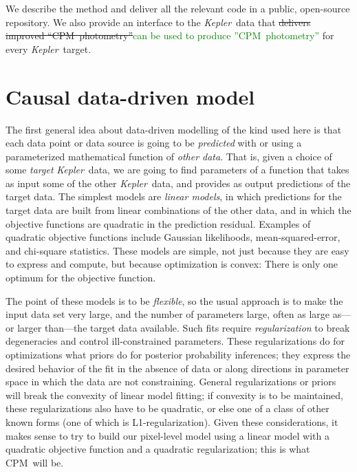 \documentclass[12pt, preprint]{aastex}
\newcommand{\project}[1]{\textsl{#1}}
\newcommand{\Kepler}{\project{Kepler}}
\newcommand{\name}{CPM}
\newcommand{\revise}[1]{\textcolor{green}{#1}}
\newcommand{\remove}[1]{\sout{#1}}
\begin{document}
We describe the method and deliver all the relevant code in a public, open-source repository.
We also provide an interface to the \Kepler\ data that \remove{delivers improved ``\name\ photometry''}\revise{can be used
to produce ''\name\ photometry''}
  for every \Kepler\ target.

\section{Causal data-driven model}

The first general idea about data-driven modelling of the kind used here
  is that each data point or data source is going to be 
  \emph{predicted} with or using a parameterized mathematical function of \emph{other data}.
That is, given a choice of some \emph{target} \Kepler\ data,
  we are going to find parameters of a function that takes as input some of the other \Kepler\ data,
  and provides as output predictions of the target data.
The simplest models are \emph{linear models},
  in which predictions for the target data are built from linear combinations of the other data,
  and in which the objective functions are quadratic in the prediction residual.
Examples of quadratic objective functions include Gaussian likelihoods, mean-squared-error, and chi-square statistics.
These models are simple,
  not just because they are easy to express and compute,
  but because optimization is convex:
There is only one optimum for the objective function.

The point of these models is to be \emph{flexible},
  so the usual approach is to make the input data set very large,
  and the number of parameters large,
  often as large as---or larger than---the target data available.
Such fits require \emph{regularization} to break degeneracies
  and control ill-constrained parameters.
These regularizations do for optimizations what priors do for posterior probability inferences;
  they express the desired behavior of the fit in the absence of data
  or along directions in parameter space in which the data are not constraining.
General regularizations or priors will break the convexity of linear model fitting;
  if convexity is to be maintained, these regularizations also have to be quadratic,
  or else one of a class of other known forms (one of which is L1-regularization).
Given these considerations, it makes sense to try to build our pixel-level model
  using a linear model with a quadratic objective function and a quadratic regularization;
  this is what \name\ will be.
\end{document}
